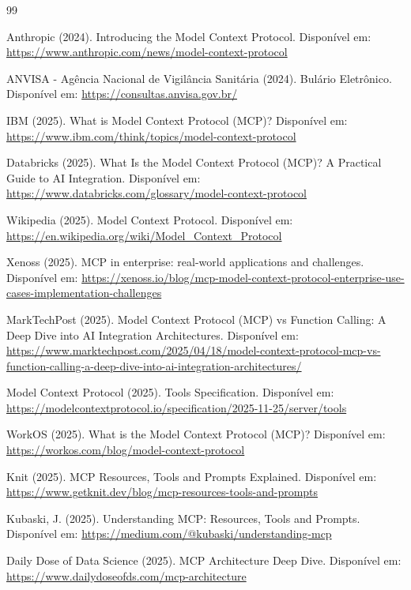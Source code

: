 \documentclass[12pt]{article}
\begin{document}
\begin{thebibliography}{99}

Anthropic (2024). Introducing the Model Context Protocol. Disponível em: \url{https://www.anthropic.com/news/model-context-protocol}

ANVISA - Agência Nacional de Vigilância Sanitária (2024). Bulário Eletrônico. Disponível em: \url{https://consultas.anvisa.gov.br/}

IBM (2025). What is Model Context Protocol (MCP)? Disponível em: \url{https://www.ibm.com/think/topics/model-context-protocol}

Databricks (2025). What Is the Model Context Protocol (MCP)? A Practical Guide to AI Integration. Disponível em: \url{https://www.databricks.com/glossary/model-context-protocol}

Wikipedia (2025). Model Context Protocol. Disponível em: \url{https://en.wikipedia.org/wiki/Model_Context_Protocol}

Xenoss (2025). MCP in enterprise: real-world applications and challenges. Disponível em: \url{https://xenoss.io/blog/mcp-model-context-protocol-enterprise-use-cases-implementation-challenges}

MarkTechPost (2025). Model Context Protocol (MCP) vs Function Calling: A Deep Dive into AI Integration Architectures. Disponível em: \url{https://www.marktechpost.com/2025/04/18/model-context-protocol-mcp-vs-function-calling-a-deep-dive-into-ai-integration-architectures/}

Model Context Protocol (2025). Tools Specification. Disponível em: \url{https://modelcontextprotocol.io/specification/2025-11-25/server/tools}

WorkOS (2025). What is the Model Context Protocol (MCP)? Disponível em: \url{https://workos.com/blog/model-context-protocol}

Knit (2025). MCP Resources, Tools and Prompts Explained. Disponível em: \url{https://www.getknit.dev/blog/mcp-resources-tools-and-prompts}

Kubaski, J. (2025). Understanding MCP: Resources, Tools and Prompts. Disponível em: \url{https://medium.com/@kubaski/understanding-mcp}

Daily Dose of Data Science (2025). MCP Architecture Deep Dive. Disponível em: \url{https://www.dailydoseofds.com/mcp-architecture}


\end{thebibliography}
\end{document}
